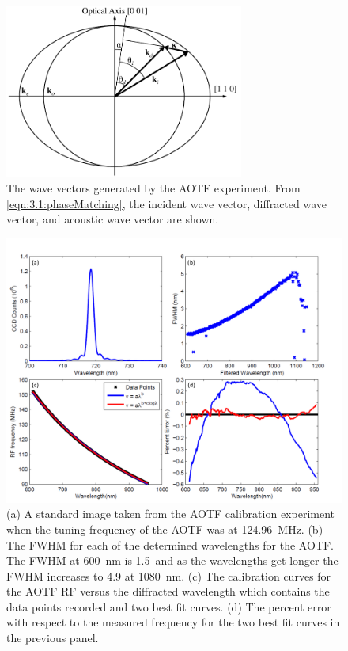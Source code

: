 \documentclass[12pt]{article}
\begin{document}



\newpage

\begin{figure}
    \begin{center}
    \includegraphics[width=0.7\textwidth]{./Images/3-1-AOTFWavevectorWithRefraction.pdf}
    \caption{The wave vectors generated by the AOTF experiment. From \autoref{eqn:3.1:phaseMatching}, the incident wave vector, diffracted wave vector, and acoustic wave vector are shown.}
    \label{fig:3.1:ATOFWavevectors}
    \end{center}
\end{figure}

\newpage

\begin{figure}
    \includegraphics[width=1.0\textwidth]{./Images/3-1-AOTFCharaterization.pdf}
    \caption{(a) A standard image taken from the AOTF calibration experiment when the tuning frequency of the AOTF was at 124.96~MHz. (b) The FWHM for each of the determined wavelengths for the AOTF. The FWHM at 600~nm is 1.5~and as the wavelengths get longer the FWHM increases to 4.9 at 1080~nm. (c) The calibration curves for the AOTF RF versus the  diffracted wavelength which contains the data points recorded and two best fit curves. (d) The percent error with respect to the measured frequency for the two best fit curves in the previous panel.}
    \label{fig:3.1:AOTFCharaterization}
\end{figure}
\end{document}
